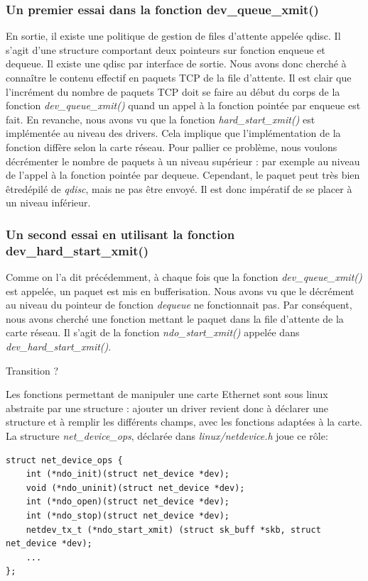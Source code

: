 \documentclass[a4paper]{article}
\begin{document}
\subsubsection{Un premier essai dans la fonction dev\_queue\_xmit()}
En sortie, il existe une politique de gestion de files d'attente appelée qdisc. Il s'agit d'une structure 
comportant deux pointeurs sur fonction enqueue et dequeue. Il existe une qdisc par interface de sortie.
Nous avons donc cherché à connaître le contenu effectif en paquets TCP de la file d'attente.
Il est clair que l'incrément du nombre de paquets TCP doit se faire au début du corps de la fonction \textit{dev\_queue\_xmit()}
quand un appel à la fonction pointée par enqueue est fait. En revanche, nous avons vu que la fonction 
\textit{hard\_start\_xmit()} est implémentée au niveau des drivers. Cela implique que l'implémentation de la fonction 
diffère selon la carte réseau. Pour pallier ce problème, nous voulons décrémenter le nombre de paquets à un 
niveau supérieur : par exemple au niveau de l'appel à la fonction pointée par dequeue.
Cependant, le paquet peut très bien êtredépilé de \textit{qdisc}, mais ne pas
être envoyé. Il est donc impératif de se placer à un niveau inférieur.

\subsubsection{Un second essai en utilisant la fonction dev\_hard\_start\_xmit()}

Comme on l'a dit précédemment, à chaque fois que la fonction \textit{dev\_queue\_xmit()} est appelée, un paquet est mis en
bufferisation. Nous avons vu que le décrément au niveau du pointeur de fonction \textit{dequeue} ne fonctionnait pas. Par 
conséquent, nous avons cherché une fonction mettant le paquet dans la file d'attente de la carte réseau. Il s'agit
de la fonction \textit{ndo\_start\_xmit()} appelée dans \textit{dev\_hard\_start\_xmit()}. 

Transition ?

Les fonctions permettant de manipuler une carte Ethernet sont sous
linux abstraite par une structure : ajouter un driver revient donc
à déclarer une structure et à remplir les différents champs, avec
les fonctions adaptées à la carte.
La structure \textit{net\_device\_ops}, déclarée dans
\textit{linux/netdevice.h} joue ce rôle:
\begin{verbatim}
struct net_device_ops {
    int (*ndo_init)(struct net_device *dev);
    void (*ndo_uninit)(struct net_device *dev);
    int (*ndo_open)(struct net_device *dev);
    int (*ndo_stop)(struct net_device *dev);
    netdev_tx_t (*ndo_start_xmit) (struct sk_buff *skb, struct net_device *dev);
    ...
};
\end{verbatim}
\end{document}
